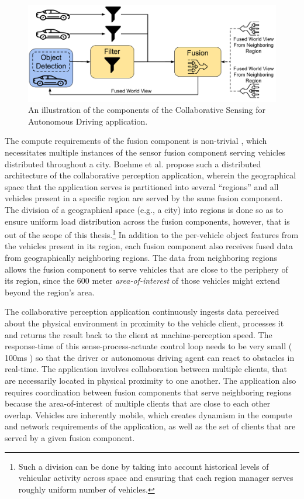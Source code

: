 \begin{figure}
\centering
\includegraphics[width=0.8\linewidth]{figures/oneedge/collaborative_driving_app.pdf}
\caption{An illustration of the components of the Collaborative Sensing for Autonomous Driving application.}
\label{fig:mapfusion_app_model}
\end{figure}

\par The compute requirements of the fusion component is non-trivial \cite{fusioneye}, which necessitates multiple instances of the sensor fusion component serving vehicles distributed throughout a city. Boehme et al. \cite{talkycars} propose such a distributed architecture of the collaborative perception application, wherein the geographical space that the application serves is partitioned into several ``regions'' and all vehicles present in a specific region are served by the same fusion component. The division of a geographical space (e.g., a city) into regions is done so as to ensure uniform load distribution across the fusion components, however, that is out of the scope of this thesis.\footnote{Such a division can be done by taking into account historical levels of vehicular activity across space and ensuring that each region manager serves roughly uniform number of vehicles.} In addition to the per-vehicle object features from the vehicles present in its region, each fusion component also receives fused data from geographically neighboring regions. The data from neighboring regions allows the fusion component to serve vehicles that are close to the periphery of its region, since the 600 meter \textit{area-of-interest} of those vehicles might extend beyond the region's area. 

\par The collaborative perception application continuously ingests data perceived about the physical environment in proximity to the vehicle client, processes it and returns the result back to the client at machine-perception speed. The response-time of this sense-process-actuate control loop needs to be very small (~ 100ms \cite{fusioneye}) so that the driver or autonomous driving agent can react to obstacles in real-time. The application involves collaboration between multiple clients, that are necessarily located in physical proximity to one another. The application also requires coordination between fusion components that serve neighboring regions because the area-of-interest of multiple clients that are close to each other overlap. Vehicles are inherently mobile, which creates dynamism in the compute and network requirements of the application, as well as the set of clients that are served by a given fusion component. 

